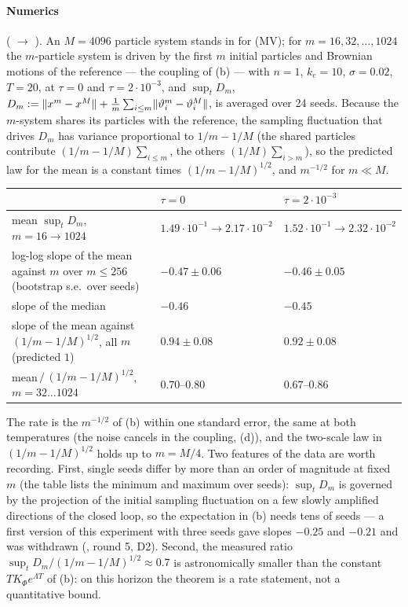 \paragraph{Numerics} ( $\to$ ). An $M = 4096$ particle system stands in
for (MV); for $m = 16, 32, \dots, 1024$ the $m$-particle system is driven by the first $m$ initial particles and
Brownian motions of the reference --- the coupling of (b) --- with $n = 1$, $k_e = 10$, $\sigma = 0.02$, $T = 20$, at
$\tau = 0$ and $\tau = 2\cdot10^{-3}$, and $\sup_tD_m$,
$D_m := \lVert x^m - x^M\rVert + \frac1m\sum_{i\le m}\lVert \vartheta^m_i - \vartheta^M_i\rVert$, is averaged over 24 seeds.
Because the $m$-system shares its particles with the reference, the sampling fluctuation that drives $D_m$ has
variance proportional to $1/m - 1/M$ (the shared particles contribute $(1/m - 1/M)\sum_{i\le m}$, the others
$(1/M)\sum_{i>m}$), so the predicted law for the mean is a constant times $(1/m - 1/M)^{1/2}$, and $m^{-1/2}$ for
$m\ll M$.
\begin{center}
\small
\begin{tabularx}{\linewidth}{@{}Yll@{}}
\toprule
 & $\tau = 0$ & $\tau = 2\cdot10^{-3}$\\
\midrule
mean $\sup_tD_m$, $m = 16\to1024$ & $1.49\cdot10^{-1}\to2.17\cdot10^{-2}$ & $1.52\cdot10^{-1}\to2.32\cdot10^{-2}$\\
log-log slope of the mean against $m$ over $m\le256$ (bootstrap s.e.\ over seeds) & $-0.47\pm0.06$ & $-0.46\pm0.05$\\
slope of the median & $-0.46$ & $-0.45$\\
slope of the mean against $(1/m - 1/M)^{1/2}$, all $m$ (predicted $1$) & $0.94\pm0.08$ & $0.92\pm0.08$\\
mean$\,/\,(1/m - 1/M)^{1/2}$, $m = 32\dots1024$ & $0.70$--$0.80$ & $0.67$--$0.86$\\
\bottomrule
\end{tabularx}
\end{center}
The rate is the $m^{-1/2}$ of (b) within one standard error, the same at both temperatures (the noise cancels in the
coupling, (d)), and the two-scale law in $(1/m - 1/M)^{1/2}$ holds up to $m = M/4$. Two features of the data are worth
recording. First, single seeds differ by more than an order of magnitude at fixed $m$ (the table lists the minimum and
maximum over seeds): $\sup_tD_m$ is governed by the projection of the initial sampling fluctuation on a few slowly
amplified directions of the closed loop, so the expectation in (b) needs tens of seeds --- a first version of this
experiment with three seeds gave slopes $-0.25$ and $-0.21$ and was withdrawn (, round 5,
D2). Second, the measured ratio $\sup_tD_m/(1/m - 1/M)^{1/2}\approx0.7$ is astronomically smaller than the constant
$TK_\Phi e^{\Lambda T}$ of (b): on this horizon the theorem is a rate statement, not a quantitative bound.

